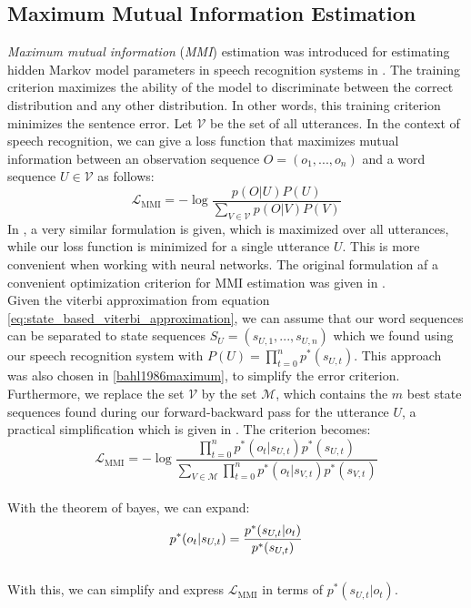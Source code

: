 \subsection{Maximum Mutual Information Estimation}
\label{sec:mmie}
\textit{Maximum mutual information} (\textit{MMI}) estimation was introduced for estimating hidden Markov model parameters in speech recognition systems in \cite{bahl1986maximum}. The training criterion maximizes the ability of the model to discriminate between the correct distribution and any other distribution. In other words, this training criterion minimizes the sentence error. Let $\mathcal{V}$ be the set of all utterances. In the context of speech recognition, we can give a loss function that maximizes mutual information between an observation sequence $O = (o_1, ..., o_n)$ and a word sequence $U \in \mathcal{V}$ as follows:
\[
\mathcal{L}_{\text{MMI}} = -\log\frac{p(O|U)P(U)}{\sum_{V \in \mathcal{V}} p(O|V)P(V)} 
\]
In \cite{ghoshal2013sequence}, a very similar formulation is given, which is maximized over all utterances, while our loss function is minimized for a single utterance $U$. This is more convenient when working with neural networks. The original formulation af a convenient optimization criterion for MMI estimation was given in \cite{schluter1998comparison}.\\
Given the viterbi approximation from equation \ref{eq:state_based_viterbi_approximation}, we can assume that our word sequences can be separated to state sequences $S_U = (s_{U,1},...,s_{U,n})$ which we found using our speech recognition system with $P(U) = \prod_{t = 0}^{n} p^*(s_{U,t})$. This approach was also chosen in \ref{bahl1986maximum}, to simplify the error criterion. Furthermore, we replace the set $\mathcal{V}$ by the set $\mathcal{M}$, which contains the $m$ best state sequences found during our forward-backward pass for the utterance $U$, a practical simplification which is given in \cite{schluter1998comparison}. The criterion becomes: 
\\ 
\[
\mathcal{L}_{\text{MMI}} = -\log\frac{\prod_{t = 0}^{n} p^*(o_{t}|s_{U,t})p^*(s_{U,t})}{\sum_{V \in \mathcal{M}} \prod_{t = 0}^{n} p^*(o_{t}|s_{V,t})p^*(s_{V,t})} 
\] \\
With the theorem of bayes, we can expand:
\[ \\
p^*(o_{t}|s_{U,t}) = \frac{p^*(s_{U,t}|o_{t})}{p^*(s_{U,t})}
\] \\
With this, we can simplify and express $\mathcal{L}_{\text{MMI}}$ in terms of $p^*(s_{U,t}|o_{t})$. \\
